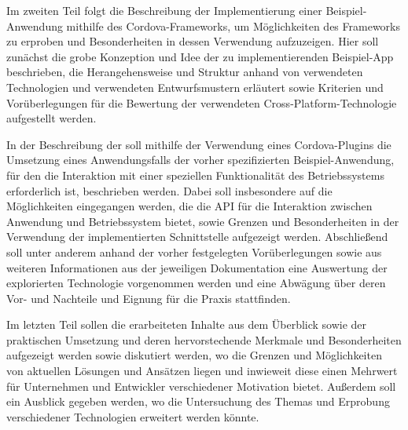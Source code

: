  Im zweiten Teil  folgt die Beschreibung der Implementierung einer Beispiel-Anwendung mithilfe des Cordova-Frameworks, um Möglichkeiten des Frameworks zu erproben und Besonderheiten in dessen Verwendung aufzuzeigen.
	Hier soll zunächst die grobe Konzeption und Idee der zu implementierenden Beispiel-App beschrieben, die Herangehensweise und Struktur anhand von verwendeten Technologien und verwendeten Entwurfsmustern erläutert sowie Kriterien und Vorüberlegungen für die Bewertung der verwendeten Cross-Platform-Technologie aufgestellt werden.
	
	In der Beschreibung der  soll mithilfe der Verwendung eines Cordova-Plugins die Umsetzung eines Anwendungsfalls der vorher spezifizierten Beispiel-Anwendung, für den die Interaktion mit einer speziellen Funktionalität des Betriebssystems erforderlich ist, beschrieben werden.
	Dabei soll insbesondere auf die Möglichkeiten eingegangen werden, die die API für die Interaktion zwischen Anwendung und Betriebssystem bietet, sowie Grenzen und Besonderheiten in der Verwendung der implementierten Schnittstelle aufgezeigt werden.
	Abschließend soll unter anderem anhand der vorher festgelegten Vorüberlegungen sowie aus weiteren Informationen aus der jeweiligen Dokumentation eine Auswertung der explorierten Technologie vorgenommen werden und eine Abwägung über deren Vor- und Nachteile und Eignung für die Praxis stattfinden.

Im letzten Teil  sollen die erarbeiteten Inhalte aus dem Überblick sowie der praktischen Umsetzung und deren hervorstechende Merkmale und Besonderheiten aufgezeigt werden sowie diskutiert werden, wo die Grenzen und Möglichkeiten von aktuellen Lösungen und Ansätzen liegen und inwieweit diese einen Mehrwert für Unternehmen und Entwickler verschiedener Motivation bietet.	%
Außerdem soll ein Ausblick gegeben werden, wo die Untersuchung des Themas und Erprobung verschiedener Technologien erweitert werden könnte.
